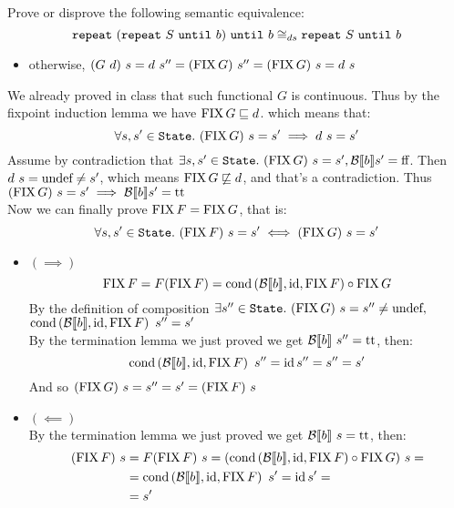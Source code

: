 \begin{exercise}{
    Prove or disprove the following semantic equivalence:
    \[ \wrepeat{(\wrepeat{S}{b})}{b} \DScong \wrepeat{S}{b} \]
}
\begin{itemize}
\begin{itemize}
                \item otherwise, $(G\ d)\ s = d\ s'' = (\FIX G)\ s'' = (\FIX G)\ s = d\ s$
            \end{itemize}
    \end{itemize}
    We already proved in class that such functional $G$ is continuous.
    Thus by the fixpoint induction lemma we have $\FIX G \sqsubseteq d$. which means that:
    \[ \forall s, s' \in \State.\ (\FIX G)\ s = s' \implies d\ s = s' \]
    Assume by contradiction that $\exists s, s' \in \State.\ (\FIX G)\ s = s', \Bool{b} s' = \False $. Then $d\ s = \undef \neq s'$, which means $\FIX G \not\sqsubseteq d$, and that's a contradiction. Thus $(\FIX G)\ s = s' \implies \Bool{b} s' = \True$ \\
    Now we can finally prove $\FIX F = \FIX G$, that is:
    \[ \forall s, s' \in \State.\ (\FIX F)\ s = s' \iff (\FIX G)\ s = s' \]
    \begin{itemize}
        \item $(\implies)$
            \[ \FIX F = F(\FIX F) = \cond{\Bool{b}}{\id}{\FIX F} \circ \FIX G \]
            By the definition of composition $\exists s'' \in \State.\ (\FIX G)\ s = s'' \neq \undef,$ \\ $\cond{\Bool{b}}{\id}{\FIX F}\ s'' = s'$ \\
            By the termination lemma we just proved we get $\Bool{b}\ s'' = \True$, then:
            \[ \cond{\Bool{b}}{\id}{\FIX F}\ s'' = \id s'' = s'' = s' \]
            And so $(\FIX G)\ s = s'' = s' = (\FIX F)\ s$
        \item $(\impliedby)$ \\
            By the termination lemma we just proved we get $\Bool{b}\ s = \True$, then:
            \begin{align*}
                (\FIX F)\ s &= F(\FIX F)\ s = (\cond{\Bool{b}}{\id}{\FIX F} \circ \FIX G)\ s = \\
                &= \cond{\Bool{b}}{\id}{\FIX F}\ s' = \id s' = \\
                &= s'
            \end{align*}
    \end{itemize}
\end{exercise}
